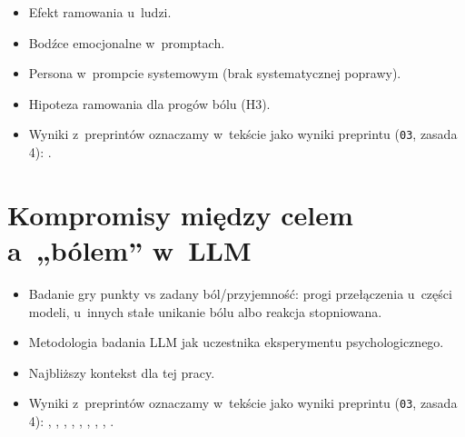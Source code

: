 \begin{planroboczy}[ok. 1 s.]
\begin{itemize}
  \item Efekt ramowania u~ludzi.
  \item Bodźce emocjonalne w~promptach.
  \item Persona w~prompcie systemowym (brak systematycznej poprawy).
  \item Hipoteza ramowania dla progów bólu (H3).
  \item Wyniki z~preprintów oznaczamy w~tekście jako wyniki preprintu (\texttt{03}, zasada 4): \cite{li2023large}.
\end{itemize}

\end{planroboczy}

\section{Kompromisy między celem a~„bólem” w~LLM}
\label{sec:3-4}

\begin{planroboczy}[ok. 1 s.]
\begin{itemize}
  \item Badanie gry punkty vs zadany ból/przyjemność: progi przełączenia u~części modeli, u~innych stałe unikanie bólu albo reakcja stopniowana.
  \item Metodologia badania LLM jak uczestnika eksperymentu psychologicznego.
  \item Najbliższy kontekst dla tej pracy.
  \item Wyniki z~preprintów oznaczamy w~tekście jako wyniki preprintu (\texttt{03}, zasada 4): \cite{keeling2024can}, \cite{bianco2026beyond}, \cite{masumori2025survival}, \cite{tagliabue2025probing}, \cite{tagliabue2026pain}, \cite{ren2026ai}, \cite{berg2026language}, \cite{schlatter2026incomplete}, \cite{mikaelson2025beyond}.
\end{itemize}

\end{planroboczy}
